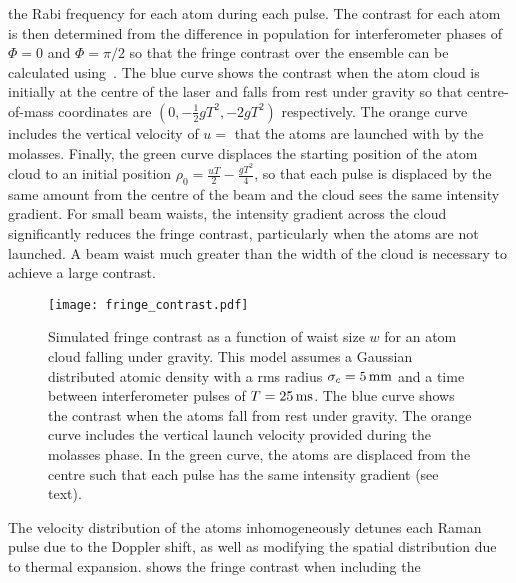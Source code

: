 the Rabi frequency for each atom during each pulse. The contrast for
each atom is then determined from the difference in population for
interferometer phases of $\Phi = 0$ and $\Phi = \pi/2$ so that the
fringe contrast over the ensemble can be calculated
using~. The blue curve shows the contrast when the atom cloud is initially at the
centre of the laser and falls from rest under gravity so that centre-of-mass coordinates are
\(\left(0, -\frac{1}{2}g T^2, -2 g T^2\right)\) respectively. The
orange curve includes the vertical velocity of
$u =$  that the atoms are launched with by the
molasses. Finally, the green curve displaces the starting position of
the atom cloud to an initial position $\rho_0 = \frac{u T}{2} - \frac{g
T^2}{4}$, so that each pulse is displaced by the same amount from the
centre of the beam and the cloud sees the same intensity gradient. For small beam waists, the intensity
gradient across the cloud significantly reduces the fringe contrast,
particularly when the atoms are not launched. A beam waist much greater than the width of the cloud is necessary to achieve a
large contrast. 
\begin{figure}[!htbp]
	\centering
	\texttt{[image: fringe\_contrast.pdf]}
	\caption[Simulated fringe contrast vs beam waist size]{Simulated fringe
		contrast as a function of waist size \(w\) for an atom cloud falling under
		gravity. This model assumes a Gaussian distributed atomic density
    with a rms radius \(\sigma_c = \sivalue{5}{\milli\metre}\) and a time between
		interferometer pulses of \(T = \sivalue{25}{\milli\second}\). The
    blue curve shows the contrast when the atoms fall from rest under gravity.
    The orange curve includes the vertical launch velocity provided
    during the molasses phase. In the green curve, the atoms are
    displaced from the centre such that each pulse has the same
  intensity gradient (see text).} 
	\label{fig:raman_fringecontrast}
\end{figure}
\par\noindent
The velocity distribution of the atoms inhomogeneously detunes each
Raman pulse due to the Doppler shift, as well as modifying
the spatial distribution due to thermal expansion.
 shows the fringe contrast when including the

